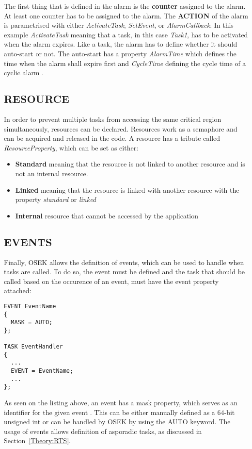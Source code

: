 The first thing that is defined in the alarm is the \textbf{counter} assigned to the alarm.
At least one counter has to be assigned to the alarm.
The \textbf{ACTION} of the alarm is parametrised with either \textit{ActivateTask}, \textit{SetEvent}, or \textit{AlarmCallback}\cite{irisa25}.
In this example \textit{ActivateTask} meaning that a task, in this case \textit{Task1}, has to be activated when the alarm expires. 
Like a task, the alarm has to define whether it should auto-start or not.
The auto-start has a property \textit{AlarmTime} which defines the time when the alarm shall expire first and \textit{CycleTime} defining the cycle time of a cyclic alarm \cite{irisa25}.

\subsection{RESOURCE}
In order to prevent multiple tasks from accessing the same critical region simultaneously, resources can be declared.
Resources work as a semaphore and can be acquired and released in the code.
A resource has a tribute called \textit{ResourceProperty}, which can be set as either:
\begin{itemize}
\item \textbf{Standard} meaning that the resource is not linked to another resource and is not an internal resource.
\item \textbf{Linked} meaning that the resource is linked with another resource with the property \textit{standard} or \textit{linked}
\item \textbf{Internal} resource that cannot be accessed by the application \cite{irisa25}
\end{itemize}

\subsection{EVENTS}
Finally, OSEK allows the definition of events, which can be used to handle when tasks are called.
To do so, the event must be defined and the task that should be called based on the occurence of an event, must have the event property attached:
\begin{lstlisting}
EVENT EventName
{
  MASK = AUTO;
};

TASK EventHandler
{
  ...
  EVENT = EventName;
  ...
};
\end{lstlisting}
As seen on the listing above, an event has a mask property, which serves as an identifier for the given event \cite{oil25}.
This can be either manually defined as a 64-bit unsigned int or can be handled by OSEK by using the AUTO keyword.
The usage of events allows definition of asporadic tasks, as discussed in Section~\ref{Theory:RTS}.
